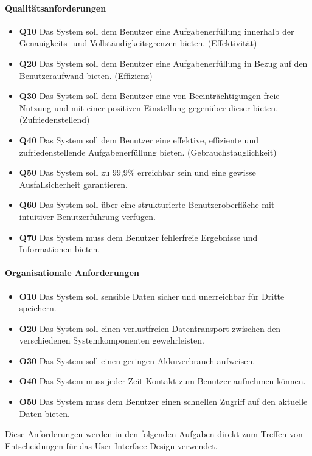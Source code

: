 \paragraph{Qualitätsanforderungen}
\begin{itemize}
	\item\textbf{\lbrack Q10\rbrack} Das System soll dem Benutzer eine Aufgabenerfüllung innerhalb der Genauigkeits- und Vollständigkeitsgrenzen bieten. (Effektivität)
	\item\textbf{\lbrack Q20\rbrack} Das System soll dem Benutzer eine Aufgabenerfüllung in Bezug auf den Benutzeraufwand bieten. (Effizienz)
	\item\textbf{\lbrack Q30\rbrack} Das System soll dem Benutzer eine von Beeinträchtigungen freie Nutzung und mit einer positiven Einstellung gegenüber dieser bieten. (Zufriedenstellend)
	\item\textbf{\lbrack Q40\rbrack} Das System soll dem Benutzer eine effektive, effiziente und zufriedenstellende Aufgabenerfüllung bieten. (Gebrauchstauglichkeit)
	\item\textbf{\lbrack Q50\rbrack} Das System soll zu 99,9\% erreichbar sein und eine gewisse Ausfallsicherheit garantieren.
	\item\textbf{\lbrack Q60\rbrack} Das System soll über eine strukturierte Benutzeroberfläche mit intuitiver Benutzerführung verfügen.
	\item\textbf{\lbrack Q70\rbrack} Das System muss dem Benutzer fehlerfreie Ergebnisse und Informationen bieten.
\end{itemize}
\paragraph{Organisationale Anforderungen}
\begin{itemize}
	\item\textbf{\lbrack O10\rbrack} Das System soll sensible Daten sicher und unerreichbar für Dritte speichern.
	\item\textbf{\lbrack O20\rbrack} Das System soll einen verlustfreien Datentransport zwischen den verschiedenen Systemkomponenten gewehrleisten.  
	\item\textbf{\lbrack O30\rbrack} Das System soll einen geringen Akkuverbrauch aufweisen.
	\item\textbf{\lbrack O40\rbrack} Das System muss jeder Zeit Kontakt zum Benutzer aufnehmen können.
	\item\textbf{\lbrack O50\rbrack} Das System muss dem Benutzer einen schnellen Zugriff auf den aktuelle Daten bieten.  
\end{itemize}
	Diese Anforderungen werden in den folgenden Aufgaben direkt zum Treffen von Entscheidungen für das User Interface Design verwendet.